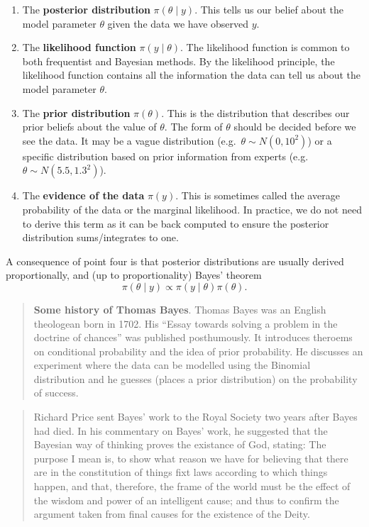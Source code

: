 \documentclass[
]{book}
\providecommand{\tightlist}{%
  \setlength{\itemsep}{0pt}\setlength{\parskip}{0pt}}
\theoremstyle{definition}
\theoremstyle{definition}
\theoremstyle{definition}
\theoremstyle{definition}
\theoremstyle{remark}
\begin{document}
\begin{enumerate}
\def\labelenumi{\arabic{enumi}.}
\tightlist
\item
  The \textbf{posterior distribution} \(\pi(\theta \mid y)\). This tells us our belief about the model parameter \(\theta\) given the data we have observed \(y\).
\item
  The \textbf{likelihood function} \(\pi(y \mid \theta)\). The likelihood function is common to both frequentist and Bayesian methods. By the likelihood principle, the likelihood function contains all the information the data can tell us about the model parameter \(\theta\).
\item
  The \textbf{prior distribution} \(\pi(\theta)\). This is the distribution that describes our prior beliefs about the value of \(\theta\). The form of \(\theta\) should be decided before we see the data. It may be a vague distribution (e.g.~\(\theta \sim N(0, 10^2)\)) or a specific distribution based on prior information from experts (e.g.~\(\theta \sim N(5.5, 1.3^2)\)).\\
\item
  The \textbf{evidence of the data} \(\pi(y)\). This is sometimes called the average probability of the data or the marginal likelihood. In practice, we do not need to derive this term as it can be back computed to ensure the posterior distribution sums/integrates to one.
\end{enumerate}

A consequence of point four is that posterior distributions are usually derived proportionally, and (up to proportionality) Bayes' theorem
\[
\pi(\theta \mid y) \propto \pi(y\mid\theta)\pi(\theta).
\]

\begin{quote}
\textbf{Some history of Thomas Bayes}. Thomas Bayes was an English theologean born in 1702. His ``Essay towards solving a problem in the doctrine of chances'' was published posthumously. It introduces theroems on conditional probability and the idea of prior probability. He discusses an experiment where the data can be modelled using the Binomial distribution and he guesses (places a prior distribution) on the probability of success.
\end{quote}

\begin{quote}
Richard Price sent Bayes' work to the Royal Society two years after Bayes had died. In his commentary on Bayes' work, he suggested that the Bayesian way of thinking proves the existance of God, stating: The purpose I mean is, to show what reason we have for believing that there are in the constitution of things fixt laws according to which things happen, and that, therefore, the frame of the world must be the effect of the wisdom and power of an intelligent cause; and thus to confirm the argument taken from final causes for the existence of the Deity.
\end{quote}
\end{document}
